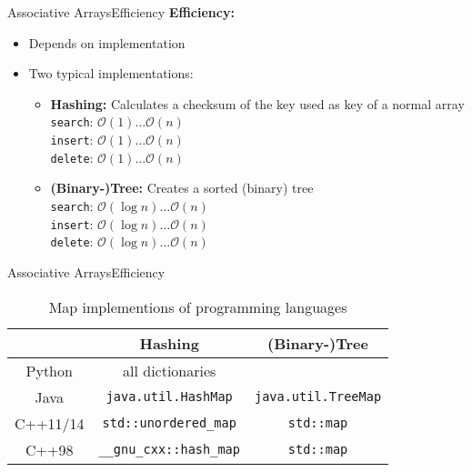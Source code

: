 
\begin{frame}{Associative Arrays}{Efficiency}
  \textbf{Efficiency:}
  \begin{itemize}
    \item
      Depends on implementation
    \item
      Two typical implementations:
      \begin{itemize}
        \item
          \textbf{Hashing:}
          Calculates a checksum of the key used as key of a normal array\\
          \texttt{search}: $\mathcal{O}(1) \dots \mathcal{O}(n)$\\
          \texttt{insert}: $\mathcal{O}(1) \dots \mathcal{O}(n)$\\
          \texttt{delete}: $\mathcal{O}(1) \dots \mathcal{O}(n)$
        \item
          \textbf{(Binary-)Tree:}
          Creates a sorted (binary) tree\\
          \texttt{search}: $\mathcal{O}(\log n) \dots \mathcal{O}(n)$\\
          \texttt{insert}: $\mathcal{O}(\log n) \dots \mathcal{O}(n)$\\
          \texttt{delete}: $\mathcal{O}(\log n) \dots \mathcal{O}(n)$
      \end{itemize}
  \end{itemize}
\end{frame}


\begin{frame}{Associative Arrays}{Efficiency}
  \begin{table}[!h]
    \caption{Map implementions of programming languages}
    \begin{tabular}{c|cc}
      {} & Hashing & (Binary-)Tree\\
      \midrule
      Python & all dictionaries & {}\\
      Java & \texttt{java.util.HashMap} & \texttt{java.util.TreeMap}\\
      C++11/14 & \texttt{std::unordered\_map} & \texttt{std::map}\\
      C++98 & \texttt{\_\_gnu\_cxx::hash\_map} & \texttt{std::map}
    \end{tabular}
  \end{table}
\end{frame}


